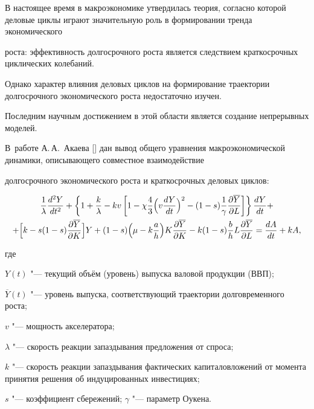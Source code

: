 \small





В настоящее время в макроэкономике утвердилась теория, согласно которой  деловые циклы играют значительную роль в формировании тренда экономического 

роста: эффективность долгосрочного роста является следствием краткосрочных циклических колебаний. 

Однако характер влияния деловых циклов на формирование траектории долгосрочного экономического роста недостаточно изучен. 

Последним научным достижением в этой области является создание непрерывных моделей. 

В~работе А.\,А.~Акаева [] дан вывод общего уравнения макроэкономической динамики, описывающего совместное взаимодействие 

долгосрочного экономического роста и краткосрочных деловых циклов: 

\begin{multline}

\label{lub:eq1}

 \frac{1}{\lambda }\frac{d^2Y}{dt^2}+\left\{ 1+\frac{k}{\lambda }-kv \left[ 1-\chi \frac{4}{3}\Bigl(v \frac{dY}{dt} \Bigr)^2-(1-s)\frac{1}{\gamma } \frac{\partial \overline Y }{\partial L} \right] \right\}\frac{dY}{dt}+ \\ +\Bigl[ k-s(1-s)\frac{\partial \overline Y }{\partial K} \Bigr]Y

+(1-s)\Bigl( \mu -k\frac{a}{h} \Bigr)K\frac{\partial \overline Y }{\partial K} %

- k(1-s)\frac{b}{h}L\frac{\partial \overline Y }{\partial L}=\frac{dA}{dt}+kA,

 \end{multline}

где

$Y(t)$ "--- текущий объём (уровень) выпуска валовой продукции (ВВП); 

$\overline Y (t)$ "--- уровень выпуска, соответствующий траектории долговременного роста; 

$v $ "--- мощность акселератора; 

$\lambda $ "--- скорость реакции запаздывания предложения от спроса; 

$k$ "--- скорость реакции запаздывания фактических капиталовложений от момента принятия решения об индуцированных инвестициях; 

$s$ "--- коэффициент сбережений; $\gamma $ "--- параметр Оукена.



